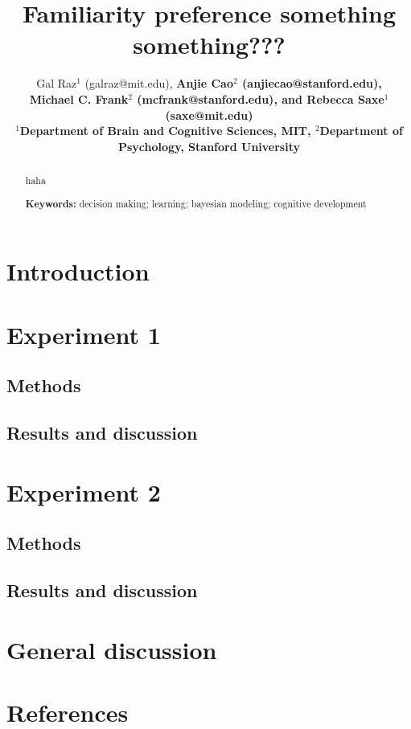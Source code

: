 \documentclass[10pt, letterpaper]{article}
\title{Familiarity preference something something???}
\author{Gal Raz$^1$ (galraz@mit.edu), \bf{Anjie Cao$^2$  (anjiecao@stanford.edu)},\\ \bf{Michael C. Frank$^2$ (mcfrank@stanford.edu)},
 and \bf{Rebecca Saxe$^1$ (saxe@mit.edu)} \\
$^1$Department of Brain and Cognitive Sciences, MIT, $^2$Department of Psychology, Stanford University \\ }
\begin{document}
\maketitle

\begin{abstract}
haha

\textbf{Keywords:}
decision making; learning; bayesian modeling; cognitive development
\end{abstract}

\hypertarget{introduction}{%
\section{Introduction}\label{introduction}}

\hypertarget{experiment-1}{%
\section{Experiment 1}\label{experiment-1}}

\hypertarget{methods}{%
\subsection{Methods}\label{methods}}

\hypertarget{results-and-discussion}{%
\subsection{Results and discussion}\label{results-and-discussion}}

\hypertarget{experiment-2}{%
\section{Experiment 2}\label{experiment-2}}

\hypertarget{methods-1}{%
\subsection{Methods}\label{methods-1}}

\hypertarget{results-and-discussion-1}{%
\subsection{Results and discussion}\label{results-and-discussion-1}}

\hypertarget{general-discussion}{%
\section{General discussion}\label{general-discussion}}

\hypertarget{references}{%
\section{References}\label{references}}

\setlength{\parindent}{-0.1in} 
\setlength{\leftskip}{0.125in}

\noindent


\end{document}

